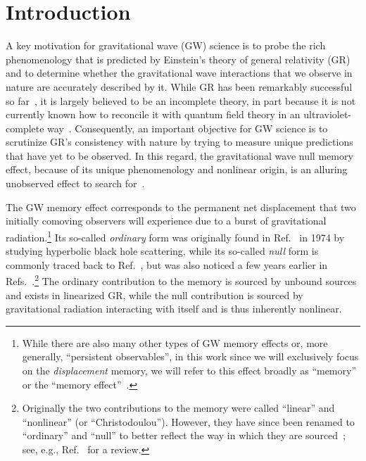 \documentclass[aps,prd,reprint,twocolumn,10pt,eqsecnum,showpacs,nofootinbib,amsfonts,amssymb,amsmath,longbibliography,superscriptaddress,floatfix]{revtex4-1}
\begin{document}

\section{Introduction}
\label{sec:introduction}

A key motivation for gravitational wave (GW) science is to probe the rich phenomenology that is predicted by Einstein's theory of general relativity (GR) and to determine whether the gravitational wave interactions that we observe in nature are accurately described by it. While GR has been remarkably successful so far~\cite{Will:2014kxa,LIGOScientific:2026qni,LIGOScientific:2026fcf,LIGOScientific:2026wpt}, it is largely believed to be an incomplete theory, in part because it is not currently known how to reconcile it with quantum field theory in an ultraviolet-complete way~\cite{Goroff:1985th}. Consequently, an important objective for GW science is to scrutinize GR's consistency with nature by trying to measure unique predictions that have yet to be observed. In this regard, the gravitational wave null memory effect, because of its unique phenomenology and nonlinear origin, is an alluring unobserved effect to search for~\cite{Zeldovich:1974gvh,Christodoulou:1991cr,Blanchet:1992br,Wiseman:1991ss,PhysRevD.45.520}. 

The GW memory effect corresponds to the permanent net displacement that two initially comoving observers will experience due to a burst of gravitational radiation.\footnote{While there are also many other types of GW memory effects or, more generally, ``persistent observables'', in this work since we will exclusively focus on the \emph{displacement} memory, we will refer to this effect broadly as ``memory'' or the ``memory effect''~\cite{Cachazo:2014fwa,Pasterski:2015tva,Nichols:2018qac,Flanagan:2018yzh,Flanagan:2019ezo,Grant:2021hga,Grant:2023ged}.} Its so-called \emph{ordinary} form was originally found in Ref.~\cite{Zeldovich:1974gvh} in 1974 by studying hyperbolic black hole scattering, while its so-called \emph{null} form is commonly traced back to Ref.~\cite{Christodoulou:1991cr}, but was also noticed a few years earlier in Refs.~\cite{Payne:1983rrr,Blanchet1990HDR}.\footnote{Originally the two contributions to the memory were called ``linear'' and ``nonlinear'' (or ``Christodoulou''). However, they have since been renamed to ``ordinary'' and ``null'' to better reflect the way in which they are sourced~\cite{Bieri:2013ada}; see, e.g., Ref.~\cite{Mitman:2024uss} for a review.} The ordinary contribution to the memory is sourced by unbound sources and exists in linearized GR, while the null contribution is sourced by gravitational radiation interacting with itself and is thus inherently nonlinear.
\end{document}
